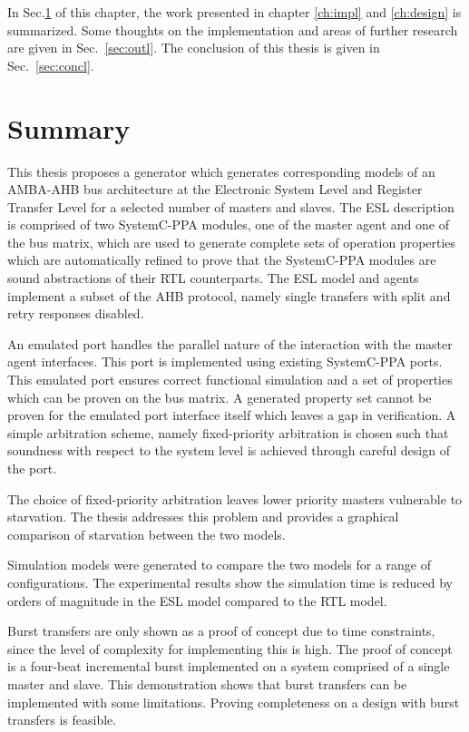 In Sec.\ref{sec:sum} of this chapter, the work presented in chapter \ref{ch:impl} and \ref{ch:design} is summarized. Some thoughts on the implementation and areas of further research are given in Sec.~\ref{sec:outl}. The conclusion of this thesis is given in Sec.~\ref{sec:concl}.

\section{Summary}
\label{sec:sum}
This thesis proposes a generator which generates corresponding models of an AMBA-AHB bus architecture at the Electronic System Level and Register Transfer Level for a selected number of masters and slaves. The ESL description is comprised of two SystemC-PPA modules, one of the master agent and one of the bus matrix, which are used to generate complete sets of operation properties which are automatically refined to prove that the SystemC-PPA modules are sound abstractions of their RTL counterparts. The ESL model and agents implement a subset of the AHB protocol, namely single transfers with split and retry responses disabled. \par
An emulated port handles the parallel nature of the interaction with the master agent interfaces. This port is implemented using existing SystemC-PPA ports. This emulated port ensures correct functional simulation and a set of properties which can be proven on the bus matrix. A generated property set cannot be proven for the emulated port interface itself which leaves a gap in verification. A simple arbitration scheme, namely fixed-priority arbitration is chosen such that soundness with respect to the system level is achieved through careful design of the port. \par
The choice of fixed-priority arbitration leaves lower priority masters vulnerable to starvation. The thesis addresses this problem and provides a graphical comparison of starvation between the two models. \par
Simulation models were generated to compare the two models for a range of configurations. The experimental results show the simulation time is reduced by orders of magnitude in the ESL model compared to the RTL model. \par 
Burst transfers are only shown as a proof of concept due to time constraints, since the level of complexity for implementing this is high. The proof of concept is a four-beat incremental burst implemented on a system comprised of a single master and slave. This demonstration shows that burst transfers can be implemented with some limitations. Proving completeness on a design with burst transfers is feasible. \par
 

